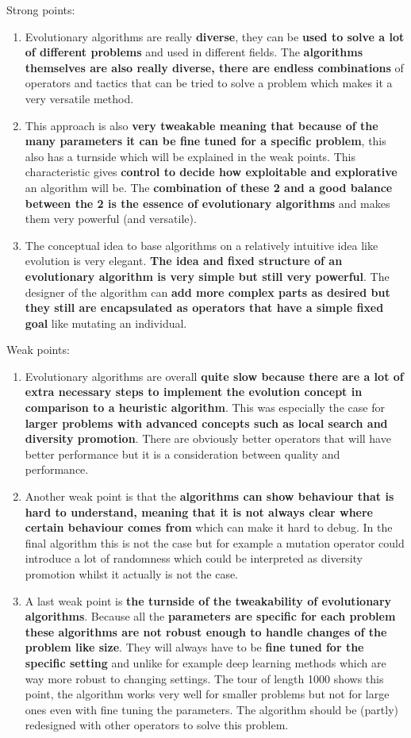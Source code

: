 \documentclass[a4paper,10pt]{article}
\begin{document}
Strong points:
\begin{enumerate}
 \item Evolutionary algorithms are really \textbf{diverse}, they can be \textbf{used to solve a lot of different problems} and used in different fields. The \textbf{algorithms themselves are also really diverse, there are endless combinations} of operators and tactics that can be tried to solve a problem which makes it a very versatile method.
 \item This approach is also \textbf{very tweakable meaning that because of the many parameters it can be fine tuned for a specific problem}, this also has a turnside which will be explained in the weak points. This characteristic gives \textbf{control to decide how exploitable and explorative} an algorithm will be. The \textbf{combination of these 2 and a good balance between the 2 is the essence of evolutionary algorithms} and makes them very powerful (and versatile).
 \item The conceptual idea to base algorithms on a relatively intuitive idea like evolution is very elegant. \textbf{The idea and fixed structure of an evolutionary algorithm is very simple but still very powerful}. The designer of the algorithm can \textbf{add more complex parts as desired but they still are encapsulated as operators that have a simple fixed goal} like mutating an individual.  
\end{enumerate}
Weak points:
\begin{enumerate}
 \item Evolutionary algorithms are overall \textbf{quite slow because there are a lot of extra necessary steps to implement the evolution concept in comparison to a heuristic algorithm}. This was especially the case for \textbf{larger problems with advanced concepts such as local search and diversity promotion}. There are obviously better operators that will have better performance but it is a consideration between quality and performance.
 \item Another weak point is that the \textbf{algorithms can show behaviour that is hard to understand, meaning that it is not always clear where certain behaviour comes from} which can make it hard to debug. In the final algorithm this is not the case but for example a mutation operator could introduce a lot of randomness which could be interpreted as diversity promotion whilst it actually is not the case.
 \item A last weak point is \textbf{the turnside of the tweakability of evolutionary algorithms}. Because all the \textbf{parameters are specific for each problem these algorithms are not robust enough to handle changes of the problem like size}. They will always have to be \textbf{fine tuned for the specific setting} and unlike for example deep learning methods which are way more robust to changing settings. The tour of length 1000 shows this point, the algorithm works very well for smaller problems but not for large ones even with fine tuning the parameters. The algorithm should be (partly) redesigned with other operators to solve this problem.
\end{enumerate}
\end{document}
